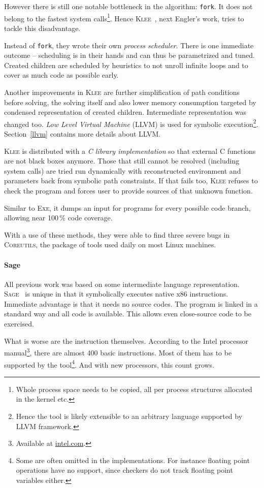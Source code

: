 \documentclass[11pt,a4paper]{article}
\begin{document}
However there is still one notable bottleneck in the algorithm: \texttt{fork}.
It does not belong to the fastest system calls\footnote{Whole process space
needs to be copied, all per process structures allocated in the kernel etc.}.
Hence \textsc{Klee}~\cite{klee}, next Engler's work, tries to tackle this
disadvantage.

Instead of \texttt{fork}, they wrote their own \emph{process scheduler}. There
is one immediate outcome -- scheduling is in their hands and can thus be
parametrized and tuned. Created children are scheduled by heuristics to not
unroll infinite loops and to cover as much code as possible early.

Another improvements in \textsc{Klee} are further simplification of path
conditions before solving, the solving itself and also lower memory
consumption targeted by condensed representation of created children.
Intermediate representation was changed too. \emph{Low Level Virtual Machine}
(LLVM) is used for symbolic execution\footnote{Hence the tool is likely
extensible to an arbitrary language supported by LLVM framework.}.
Section~\ref{llvm} contains more details about LLVM.

\textsc{Klee} is distributed with a \emph{C library implementation} so that
external C functions are not black boxes anymore. Those that still cannot be
resolved (including system calls) are tried run dynamically with reconstructed
environment and parameters back from symbolic path constraints. If that fails
too, \textsc{Klee} refuses to check the program and forces user to provide
sources of that unknown function.

Similar to \textsc{Exe}, it dumps an input for programs for every possible
code branch, allowing near 100\,\% code coverage.

With a use of these methods, they were able to find three severe bugs in
\textsc{Coreutils}, the package of tools used daily on most Linux machines.

\paragraph{Sage} All previous work was based on some intermediate language
representation. \textsc{Sage}~\cite{sage} is unique in that it symbolically
executes native x86 instructions. Immediate advantage is that it needs no
source codes. The program is linked in a standard way and all code is
available. This allows even close-source code to be exercised.

What is worse are the instruction themselves. According to the Intel processor
manual\footnote{Available at \url{intel.com}.}, there are almost 400 basic
instructions. Most of them has to be supported by the tool\footnote{Some are
often omitted in the implementations. For instance floating point operations
have no support, since checkers do not track floating point variables
either.}. And with new processors, this count grows.
\end{document}
